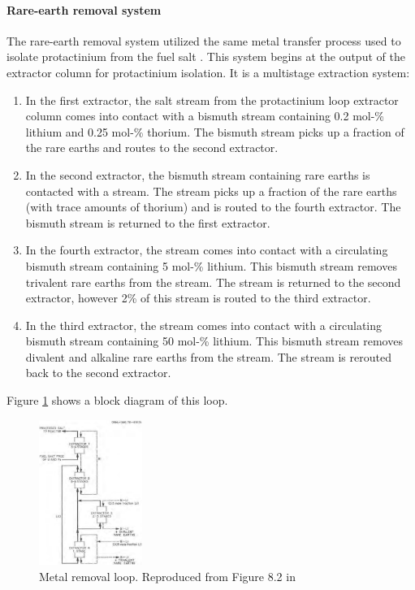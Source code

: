 \paragraph{Rare-earth removal system}
The rare-earth removal system utilized the same metal transfer process used to
isolate protactinium from the fuel salt \cite{robertson_conceptual_1971}. This
system begins at the output of the extractor column for protactinium isolation.
It is a multistage extraction system:
\begin{enumerate}
    \item In the first extractor, the salt stream from the protactinium loop
    extractor column comes into contact with a bismuth stream containing 0.2 mol-\%
    lithium and 0.25 mol-\% thorium. The bismuth stream picks up a fraction of
    the rare earths and routes to the second extractor.
    \item In the second extractor, the bismuth stream containing rare earths is
    contacted with a  stream.  The  stream picks up a fraction
    of the rare earths (with trace amounts of thorium) and is routed to the
    fourth extractor. The bismuth stream is returned to the first extractor.
    \item In the fourth extractor, the  stream comes into contact with a
    circulating bismuth stream containing 5 mol-\% lithium. This bismuth stream
    removes trivalent rare earths from the  stream. The 
    stream is returned to the second extractor, however 2\% of this 
    stream is routed to the third extractor.
    \item In the third extractor, the  stream comes into contact with a
    circulating bismuth stream containing 50 mol-\% lithium. This bismuth stream
    removes divalent and alkaline rare earths from the  stream. The
     stream is rerouted back to the second extractor.
\end{enumerate}

Figure \ref{fig:metal-removal} shows a block diagram of this loop. 

\begin{figure}[htpb]
    \centering
    \includegraphics[width=0.3\textwidth]{figs/ch4/metal_removal_loop.png}
    \caption{Metal removal loop. Reproduced from Figure 8.2 in \cite{robertson_conceptual_1971}}
    \label{fig:metal-removal}
\end{figure}

